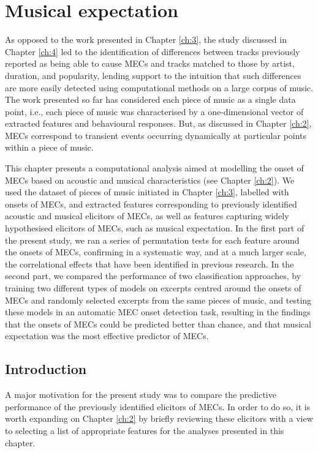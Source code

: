 
\chapter{Musical expectation}
\label{ch:5}

As opposed to the work presented in Chapter \ref{ch:3}, the study discussed in Chapter \ref{ch:4} led to the identification of differences between tracks previously reported as being able to cause MECs and tracks matched to those by artist, duration, and popularity, lending support to the intuition that such differences are more easily detected using computational methods on a large corpus of music. The work presented so far has considered each piece of music as a single data point, i.e., each piece of music was characterised by a one-dimensional vector of extracted features and behavioural responses. But, as discussed in Chapter \ref{ch:2}, MECs correspond to transient events occurring dynamically at particular points within a piece of music.

This chapter presents a computational analysis aimed at modelling the onset of MECs based on acoustic and musical characteristics (see Chapter \ref{ch:2}). We used the dataset of pieces of music initiated in Chapter \ref{ch:3}, labelled with onsets of MECs, and extracted features corresponding to previously identified acoustic and musical elicitors of MECs, as well as features capturing widely hypothesised elicitors of MECs, such as musical expectation. In the first part of the present study, we ran a series of permutation tests for each feature around the onsets of MECs, confirming in a systematic way, and at a much larger scale, the correlational effects that have been identified in previous research. In the second part, we compared the performance of two classification approaches, by training two different types of models on excerpts centred around the onsets of MECs and randomly selected excerpts from the same pieces of music, and testing these models in an automatic MEC onset detection task, resulting in the findings that the onsets of MECs could be predicted better than chance, and that musical expectation was the most effective predictor of MECs. 

\section{Introduction}
\label{se:exp-intro}

A major motivation for the present study was to compare the predictive performance of the previously identified elicitors of MECs. In order to do so, it is worth expanding on Chapter \ref{ch:2} by briefly reviewing these elicitors with a view to selecting a list of appropriate features for the analyses presented in this chapter.

